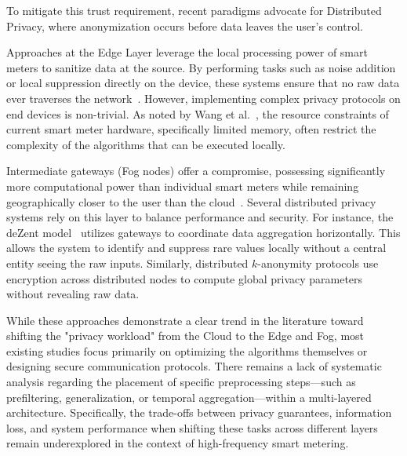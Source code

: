 To mitigate this trust requirement, recent paradigms advocate for Distributed Privacy, where anonymization occurs before data leaves the user's control.

Approaches at the Edge Layer leverage the local processing power of smart meters to sanitize data at the source. By performing tasks such as noise addition or local suppression directly on the device, these systems ensure that no raw data ever traverses the network~\cite{edgecomputing}. However, implementing complex privacy protocols on end devices is non-trivial. As noted by Wang et al.~\cite{EdgeIntelligenceSmartMeters}, the resource constraints of current smart meter hardware, specifically limited memory, often restrict the complexity of the algorithms that can be executed locally.

Intermediate gateways (Fog nodes) offer a compromise, possessing significantly more computational power than individual smart meters while remaining geographically closer to the user than the cloud~\cite{fogcomputing}. Several distributed privacy systems rely on this layer to balance performance and security. For instance, the deZent model~\cite{dezent2025} utilizes gateways to coordinate data aggregation horizontally. This allows the system to identify and suppress rare values locally without a central entity seeing the raw inputs. Similarly, distributed $k$-anonymity protocols \cite{DistrKAnon} use encryption across distributed nodes to compute global privacy parameters without revealing raw data.

While these approaches demonstrate a clear trend in the literature toward shifting the "privacy workload" from the Cloud to the Edge and Fog, most existing studies focus primarily on optimizing the algorithms themselves or designing secure communication protocols. There remains a lack of systematic analysis regarding the placement of specific preprocessing steps---such as prefiltering, generalization, or temporal aggregation---within a multi-layered architecture. Specifically, the trade-offs between privacy guarantees, information loss, and system performance when shifting these tasks across different layers remain underexplored in the context of high-frequency smart metering.



